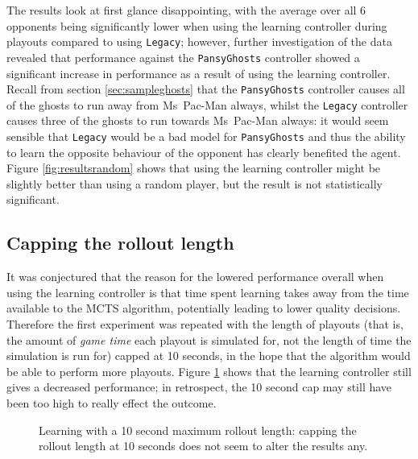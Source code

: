 The results look at first glance disappointing, with the average over all 6 opponents being significantly lower when using the learning controller during playouts compared to using {\tt Legacy}; however, further investigation of the data revealed that performance against the {\tt PansyGhosts} controller showed a significant increase in performance as a result of using the learning controller.  Recall from section \ref{sec:sampleghosts} that the {\tt PansyGhosts} controller causes all of the ghosts to run away from Ms~Pac-Man always, whilst the {\tt Legacy} controller causes three of the ghosts to run towards Ms~Pac-Man always: it would seem sensible that {\tt Legacy} would be a bad model for {\tt PansyGhosts} and thus the ability to learn the opposite behaviour of the opponent has clearly benefited the agent.  Figure \ref{fig:resultsrandom} shows that using the learning controller might be slightly better than using a random player, but the result is not statistically significant.

\subsection{Capping the rollout length}

It was conjectured that the reason for the lowered performance overall when using the learning controller is that time spent learning takes away from the time available to the MCTS algorithm, potentially leading to lower quality decisions.  Therefore the first experiment was repeated with the length of playouts (that is, the amount of \emph{game time} each playout is simulated for, not the length of time the simulation is run for) capped at 10 seconds, in the hope that the algorithm would be able to perform more playouts.  Figure \ref{fig:resultssr} shows that the learning controller still gives a decreased performance; in retrospect, the 10 second cap may still have been too high to really effect the outcome.

\begin{figure}
\centering
{}
\caption[Learning with a 10 second maximum rollout length]{Learning with a 10 second maximum rollout length: capping the rollout length at 10 seconds does not seem to alter the results any.}
\label{fig:resultssr}
\end{figure}

